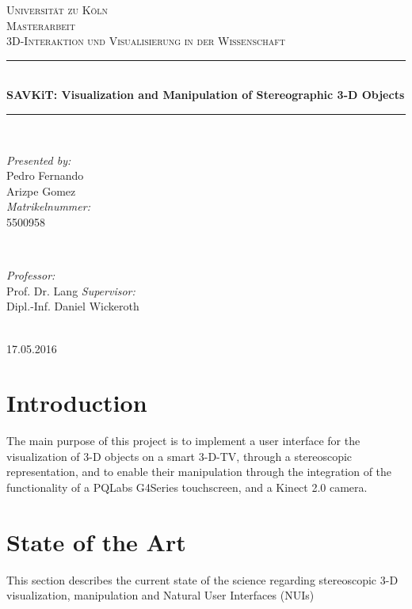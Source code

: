 \documentclass[12pt]{extarticle}
\date{}
\begin{document}
\begin{titlepage}
\newcommand{\HRule}{\rule{\linewidth}{0.5mm}}
\center
\textsc{\LARGE Universität zu Köln}\\[1.5cm]
\textsc{\Large Masterarbeit}\\[0.5cm] 
\textsc{\large 3D-Interaktion und Visualisierung
 in der Wissenschaft}\\[0.5cm] 
\HRule \\[0.4cm]
{ \Large \bfseries 
SAVKiT: Visualization and Manipulation of Stereographic 3-D Objects}\\[0.4cm]
\HRule \\[1.5cm]
\begin{minipage}{0.4\textwidth}
\begin{flushleft} \large
\emph{Presented by:}\\
Pedro Fernando \\
Arizpe Gomez\\ 
\emph{Matrikelnummer:}\\
5500958 
\end{flushleft}
\end{minipage}
~
\begin{minipage}{0.4\textwidth}
\begin{flushright}
\large\emph{Professor:} \\
Prof. Dr. Lang
\large\emph{Supervisor:} \\
Dipl.-Inf. Daniel Wickeroth
\end{flushright}
\end{minipage}\\[4cm]
{\large 17.05.2016}\\[3cm] 
\vfill 
\end{titlepage}
\tableofcontents
\pagebreak{}
\section{Introduction} \label{sec:Int}
The main purpose of this project is to implement a user interface for the visualization of 3-D objects on a smart 3-D-TV, through a stereoscopic representation, and to enable their manipulation through the integration of the functionality of a PQLabs G4Series touchscreen, and a Kinect 2.0 camera.

\section{State of the Art}\label{sec:Soa}
This section describes the current state of the science regarding stereoscopic 3-D visualization, manipulation and Natural User Interfaces (NUIs)
\end{document}
